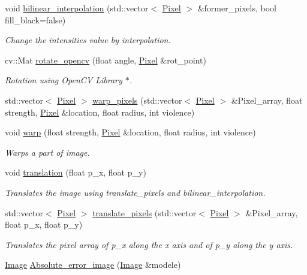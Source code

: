 \begin{DoxyCompactItemize}
void \hyperlink{class_image_a80b8db5c7a26eda57496f2cf53c54b5f}{bilinear\+\_\+interpolation} (std\+::vector$<$ \hyperlink{class_pixel}{Pixel} $>$ \&former\+\_\+pixels, bool fill\+\_\+black=false)
\begin{DoxyCompactList}\small\item\em Change the intensities value by interpolation. \end{DoxyCompactList}\item 
cv\+::\+Mat \hyperlink{class_image_ae18a138b9b7442a3429af2635afd8569}{rotate\+\_\+opencv} (float angle, \hyperlink{class_pixel}{Pixel} \&rot\+\_\+point)
\begin{DoxyCompactList}\small\item\em Rotation using Open\+CV Library $\ast$. \end{DoxyCompactList}\item 
std\+::vector$<$ \hyperlink{class_pixel}{Pixel} $>$ \hyperlink{class_image_a0b096c96e00fce35e5485699636618ce}{warp\+\_\+pixels} (std\+::vector$<$ \hyperlink{class_pixel}{Pixel} $>$ \&Pixel\+\_\+array, float strength, \hyperlink{class_pixel}{Pixel} \&location, float radius, int violence)
\item 
void \hyperlink{class_image_a514a67255f9227495b3fc807cec17b09}{warp} (float strength, \hyperlink{class_pixel}{Pixel} \&location, float radius, int violence)
\begin{DoxyCompactList}\small\item\em Warps a part of image. \end{DoxyCompactList}\item 
void \hyperlink{class_image_a3f3a121ab99ee4e67d891316bb802f02}{translation} (float p\+\_\+x, float p\+\_\+y)
\begin{DoxyCompactList}\small\item\em Translates the image using translate\+\_\+pixels and bilinear\+\_\+interpolation. \end{DoxyCompactList}\item 
std\+::vector$<$ \hyperlink{class_pixel}{Pixel} $>$ \hyperlink{class_image_ab26f28b1449fbb2f4fd4877df1bdb4d4}{translate\+\_\+pixels} (std\+::vector$<$ \hyperlink{class_pixel}{Pixel} $>$ \&Pixel\+\_\+array, float p\+\_\+x, float p\+\_\+y)
\begin{DoxyCompactList}\small\item\em Translates the pixel array of p\+\_\+x along the x axis and of p\+\_\+y along the y axis. \end{DoxyCompactList}\item 
\hyperlink{class_image}{Image} \hyperlink{class_image_aefdd49d01f47aeb93d507631adf4eacd}{Absolute\+\_\+error\+\_\+image} (\hyperlink{class_image}{Image} \&modele)

\end{DoxyCompactItemize}

